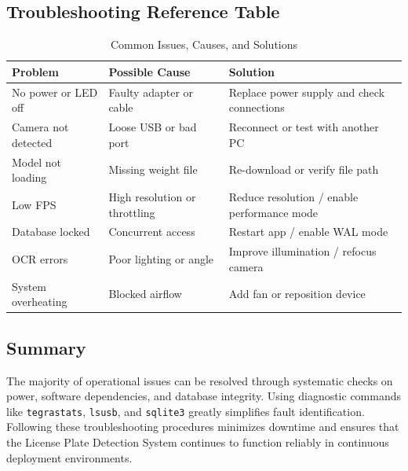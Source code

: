 \subsection*{Troubleshooting Reference Table}

\begin{table}[h!]
	\centering
	\caption{Common Issues, Causes, and Solutions}
	\begin{tabular}{|p{3.5cm}|p{4cm}|p{6cm}|}
		\hline
		\textbf{Problem} & \textbf{Possible Cause} & \textbf{Solution} \\ \hline
		No power or LED off & Faulty adapter or cable & Replace power supply and check connections \\ \hline
		Camera not detected & Loose USB or bad port & Reconnect or test with another PC \\ \hline
		Model not loading & Missing weight file & Re-download or verify file path \\ \hline
		Low FPS & High resolution or throttling & Reduce resolution / enable performance mode \\ \hline
		Database locked & Concurrent access & Restart app / enable WAL mode \\ \hline
		OCR errors & Poor lighting or angle & Improve illumination / refocus camera \\ \hline
		System overheating & Blocked airflow & Add fan or reposition device \\ \hline
	\end{tabular}
\end{table}

\subsection*{Summary}

The majority of operational issues can be resolved through systematic checks on power, software dependencies, and database integrity.  
Using diagnostic commands like \texttt{tegrastats}, \texttt{lsusb}, and \texttt{sqlite3} greatly simplifies fault identification.  
Following these troubleshooting procedures minimizes downtime and ensures that the License Plate Detection System continues to function reliably in continuous deployment environments.







